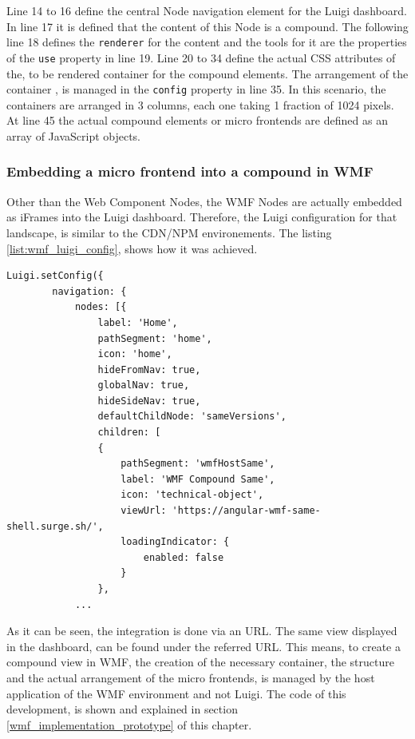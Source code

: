 Line 14 to 16 define the central Node navigation element for the Luigi dashboard. In line 17 it is defined that the content of this Node is a compound. The following line 18 defines the \texttt{renderer} for the content and the tools for it are the properties of the \texttt{use} property in line 19. Line 20 to 34 define the actual CSS attributes of the, to be rendered container for the compound elements. The arrangement of the container , is managed in the \texttt{config} property in line 35. In this scenario, the containers are arranged in 3 columns, each one taking 1 fraction of 1024 pixels.
At line 45 the actual compound elements or micro frontends are defined as an array of JavaScript objects.

\subsubsection{Embedding a micro frontend into a compound in WMF}
\label{embedd_mfe_in_wmf}

Other than the Web Component Nodes, the WMF Nodes are actually embedded as iFrames into the Luigi dashboard. Therefore, the Luigi configuration for that landscape, is similar to the CDN/NPM environements. The listing \ref{list:wmf_luigi_config}, shows how it was achieved.

\begin{lstlisting}[caption=Example configuration to embed a WMF micro frontend compound as a Node in Luigi, label=list:wmf_luigi_config,  xleftmargin=.0\textwidth, xrightmargin=.0\textwidth]
	Luigi.setConfig({
		navigation: {
			nodes: [{
				label: 'Home',
				pathSegment: 'home',
				icon: 'home',
				hideFromNav: true,
				globalNav: true,
				hideSideNav: true,
				defaultChildNode: 'sameVersions',
				children: [
                {
					pathSegment: 'wmfHostSame',
					label: 'WMF Compound Same',
					icon: 'technical-object',
					viewUrl: 'https://angular-wmf-same-shell.surge.sh/',
					loadingIndicator: {
						enabled: false
					}
				},
			...
\end{lstlisting}

As it can be seen, the integration is done via an URL. The same view displayed in the dashboard, can be found under the referred URL. This means, to create a compound view in WMF, the creation of the necessary container, the structure and the actual arrangement of the micro frontends, is managed by the host application of the WMF environment and not Luigi.
The code of this development, is shown and explained in section \ref{wmf_implementation_prototype} of this chapter.

